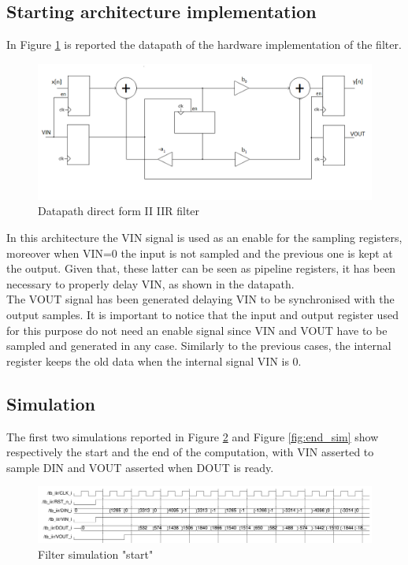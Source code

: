 \documentclass[a4paper, titlepage]{article}
\begin{document}
\subsection{Starting architecture implementation}
In Figure \ref{fig:filter_base_version} is reported the datapath of the hardware implementation of the filter.
 
  \begin{figure} [h]
\centering
	\includegraphics[scale=0.4]{filter_base_version.png}
	\caption{Datapath direct form II IIR filter}
	\label{fig:filter_base_version}
\end{figure}
\noindent In this architecture the VIN signal is used as an enable for the sampling registers, moreover when VIN=0 the input is not sampled and the previous one is kept at the output. 
 \newline
 Given that, these latter can be seen as pipeline registers, it has been necessary to properly delay VIN, as shown in the datapath.\\
 The VOUT signal has been generated delaying VIN to be synchronised with the output samples. It is important to notice that the input and output register used for this purpose do not need an enable signal since VIN and VOUT have to be sampled and generated in any case. 
 \newline
 Similarly to the previous cases, the internal register keeps the old data when the internal signal VIN is 0.
 \newpage
 \subsection{Simulation}
 
 
The first two simulations reported in Figure \ref{fig:start_sim} and Figure \ref{fig:end_sim} show respectively the start and the end of the computation, with VIN asserted to sample DIN and VOUT asserted when DOUT is ready. 

\begin{figure} [h]
\centering
	\includegraphics[scale=0.55]{start_sim.png}
	\caption{Filter simulation "start"}
	\label{fig:start_sim}
\end{figure} 
\end{document}
